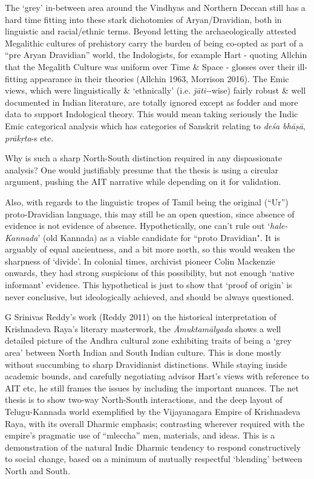 The ‘grey’ in-between area around the Vindhyas and Northern Deccan still has a hard time fitting into these stark dichotomies of Aryan/Dravidian, both in linguistic and racial/ethnic terms. Beyond letting the archaeologically attested Megalithic cultures of prehistory carry the burden of being co-opted as part of a “pre Aryan Dravidian” world, the Indologists, for example Hart - quoting Allchin that the Megalith Culture was uniform over Time \& Space - glosses over their ill-fitting appearance in their theories (Allchin 1963, Morrison 2016). The Emic views, which were linguistically \& ‘ethnically’ (i.e. \textit{jāti-}-wise) fairly robust \& well documented in Indian literature, are totally ignored except as fodder and more data to support Indological theory. This would mean taking seriously the Indic Emic categorical analysis which has categories of Sanskrit relating to \textit{deśa bhāṣā}, \textit{prākṛta}-s etc.

Why is such a sharp North-South distinction required in any dispassionate analysis? One would justifiably presume that the thesis is using a circular argument, pushing the AIT narrative while depending on it for validation.

Also, with regards to the linguistic tropes of Tamil being the original (“Ur”) proto-Dravidian language, this may still be an open question, since absence of evidence is not evidence of absence. Hypothetically, one can’t rule out ‘\textit{hale-Kannada}’ (old Kannada) as a viable candidate for “proto Dravidian". It is arguably of equal ancientness, and a bit more north, so this would weaken the sharpness of ‘divide’. In colonial times, archivist pioneer Colin Mackenzie onwards, they had strong suspicions of this possibility, but not enough ‘native informant’ evidence. This hypothetical is just to show that ‘proof of origin’ is never conclusive, but ideologically achieved, and should be always questioned.

G Srinivas Reddy’s work (Reddy 2011) on the historical interpretation of Krishnadeva Raya’s literary masterwork, the \textit{Āmuktamālyada} shows a well detailed picture of the Andhra cultural zone exhibiting traits of being a ‘grey area’ between North Indian and South Indian culture. This is done mostly without succumbing to sharp Dravidianist distinctions. While staying inside academic bounds, and carefully negotiating advisor Hart’s views with reference to AIT etc, he still frames the issues by including the important nuances. The net thesis is to show two-way North-South interactions, and the deep layout of Telugu-Kannada world exemplified by the Vijayanagara Empire of Krishnadeva Raya, with its overall Dharmic emphasis; contrasting wherever required with the empire’s pragmatic use of “mleccha” men, materials, and ideas. This is a demonstration of the natural Indic Dharmic tendency to respond constructively to social change, based on a minimum of mutually respectful ‘blending’ between North and South.


